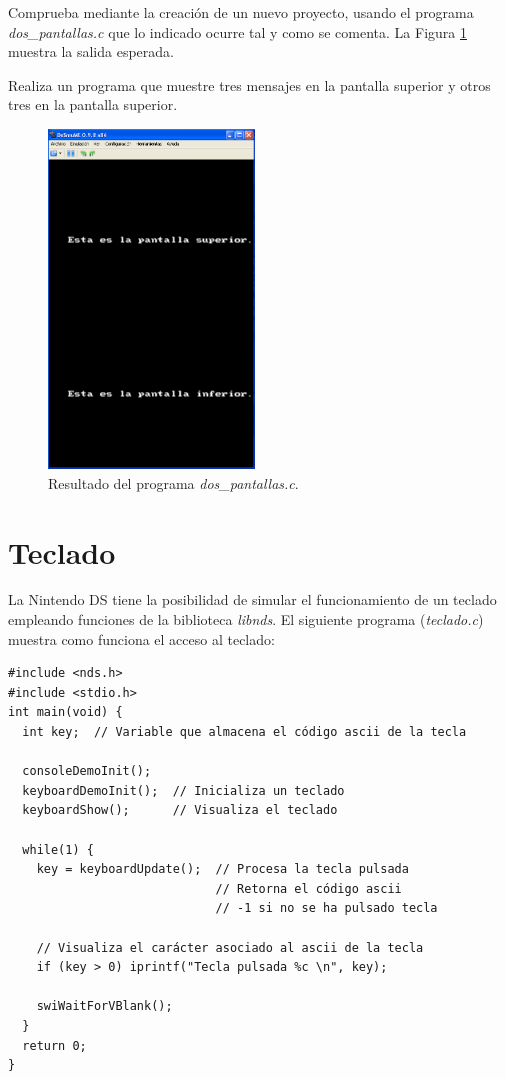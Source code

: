 \begin{exercise}
Comprueba mediante la creación de un nuevo proyecto, usando el programa \textit{dos\_pantallas.c} que lo indicado ocurre tal y como se comenta. La Figura \ref{p3_c2_dos_pantallas} muestra la salida esperada.
\end{exercise}


\begin{exercise}
	Realiza un programa que muestre tres mensajes en la pantalla superior y otros tres en la pantalla superior.
\end{exercise}

\begin{figure}[t]
\centering
 \includegraphics[height=9cm]{Figuras/C3/c3_sol-ejercicios-dospantallas.png}
\caption{Resultado del programa \textit{dos\_pantallas.c}.}
\label{p3_c2_dos_pantallas}
\end{figure}

\section{Teclado}
La Nintendo DS tiene la posibilidad de simular el funcionamiento de un teclado empleando funciones de la biblioteca \textit{libnds}. El siguiente programa (\textit{teclado.c}) muestra como funciona el acceso al teclado:

\begin{lstlisting}
#include <nds.h>
#include <stdio.h>
int main(void) {    
  int key;  // Variable que almacena el código ascii de la tecla
    
  consoleDemoInit();  
  keyboardDemoInit();  // Inicializa un teclado
  keyboardShow();      // Visualiza el teclado

  while(1) {       
    key = keyboardUpdate();  // Procesa la tecla pulsada
                             // Retorna el código ascii 
                             // -1 si no se ha pulsado tecla 

    // Visualiza el carácter asociado al ascii de la tecla 
    if (key > 0) iprintf("Tecla pulsada %c \n", key); 

    swiWaitForVBlank(); 
  }
  return 0;
}
\end{lstlisting}


